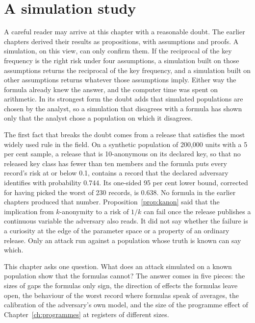 \chapter{A simulation study}\label{ch:simulation}

A careful reader may arrive at this chapter with a reasonable doubt. The earlier
chapters derived their results as propositions, with assumptions and proofs. A
simulation, on this view, can only confirm them. If the reciprocal of the key
frequency is the right risk under four assumptions, a simulation built on those
assumptions returns the reciprocal of the key frequency, and a simulation built on
other assumptions returns whatever those assumptions imply. Either way the formula
already knew the answer, and the computer time was spent on arithmetic. In its
strongest form the doubt adds that simulated populations are chosen by the
analyst, so a simulation that disagrees with a formula has shown only that the
analyst chose a population on which it disagrees.

The first fact that breaks the doubt comes from a release that satisfies the most
widely used rule in the field. On a synthetic population of 200,000 units with a
5 per cent sample, a release that is 10-anonymous on its declared key, so that no
released key class has fewer than ten members and the formula puts every record's
risk at or below 0.1, contains a record that the declared adversary identifies with
probability 0.744. Its one-sided 95 per cent lower bound, corrected for having
picked the worst of 230 records, is 0.638.
No formula in the earlier chapters produced that number. Proposition~\ref{prop:kanon}
said that the implication from $k$-anonymity to a risk of $1/k$ can fail once the
release publishes a continuous variable the adversary also reads. It did not say
whether the failure is a curiosity at the edge of the parameter space or a
property of an ordinary release. Only an attack run against a population whose
truth is known can say which.

This chapter asks one question. What does an attack simulated on a known
population show that the formulas cannot? The answer comes in five pieces: the
sizes of gaps the formulas only sign, the direction of effects the formulas leave
open, the behaviour of the worst record where formulas speak of averages, the
calibration of the adversary's own model, and the size of the programme effect of
Chapter~\ref{ch:programmes} at registers of different sizes.


